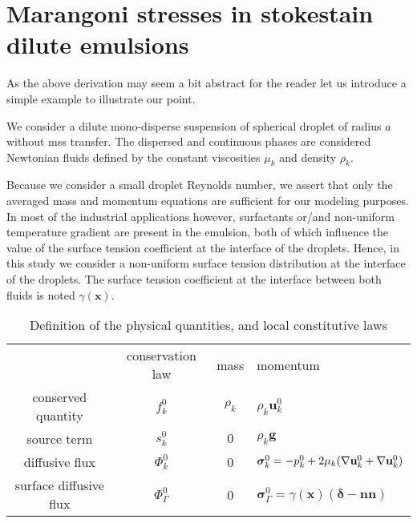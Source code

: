 \section{Marangoni stresses in stokestain dilute emulsions}



As the above derivation may seem a bit abstract for the reader let us introduce a simple example to illustrate our point. 

We consider a dilute mono-disperse suspension of spherical droplet of radius $a$ without mss transfer. 
The dispersed  and continuous phases are considered Newtonian fluids defined by the constant viscosities $\mu_k$ and density $\rho_k$.

Because we consider a small droplet Reynolds number, we assert that only the averaged mass and momentum equations are sufficient for our modeling purposes. 
In most of the industrial applications however, surfactants or/and non-uniform temperature gradient are present in the emulsion, both of which influence the value of the surface tension coefficient at the interface of the droplets.
Hence, in this study we consider a non-uniform surface tension distribution at the interface of the droplets. 
The surface tension coefficient at the interface between both fluids is noted $\gamma(\textbf{x})$. 
\begin{table}
    \centering
    \begin{tabular}{cccl}
    & conservation law & mass & momentum \\
    conserved quantity & $f_k^0$  & $\rho_k$ & $\rho_k \textbf{u}_k^0$ \\
    source term & $s_k^0$  & $0$ & $\rho_k \textbf{g}$ \\
    diffusive flux & $\Phi_k^0$ & 0 & $\bm\sigma_k^0 = -p_k^0 + 2\mu_k (\mathbf{\nabla} \textbf{u}_k^0 + \mathbf{\nabla} \textbf{u}_k^0)$ \\
    surface diffusive flux & $\Phi_\Gamma^0$ & 0 & $\bm\sigma_\Gamma^0 = \gamma(\textbf{x}) (\bm\delta - \textbf{nn})$ \\
    \end{tabular}
    \caption{Definition of the physical quantities, and local constitutive laws}
    \label{tab:qte_Newtonian}
\end{table}


